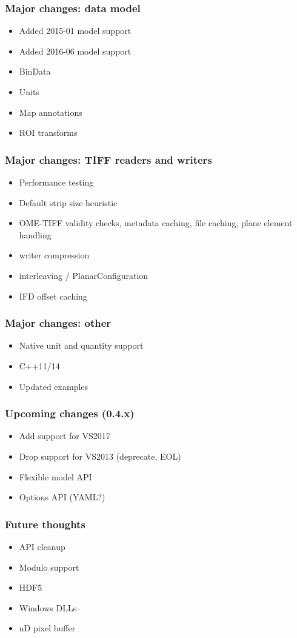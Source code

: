 \documentclass{beamer}
\begin{document}
\begin{frame}[fragile]
  \frametitle{Major changes: data model}

  \begin{itemize}
  \item Added 2015-01 model support
  \item Added 2016-06 model support
  \item BinData
  \item Units
  \item Map annotations
  \item ROI transforms
  \end{itemize}
\end{frame}

\begin{frame}[fragile]
  \frametitle{Major changes: TIFF readers and writers}

  \begin{itemize}
  \item Performance testing
  \item Default strip size heuristic
  \item OME-TIFF validity checks, metadata caching, file caching, plane element handling
  \item writer compression
  \item interleaving / PlanarConfiguration
  \item IFD offset caching
    
  \end{itemize}
\end{frame}

\begin{frame}[fragile]
  \frametitle{Major changes: other}

  \begin{itemize}
  \item Native unit and quantity support
  \item C++11/14
  \item Updated examples
  \end{itemize}
\end{frame}

\begin{frame}[fragile]
  \frametitle{Upcoming changes (0.4.x)}

  \begin{itemize}
  \item Add support for VS2017
  \item Drop support for VS2013 (deprecate, EOL)
  \item Flexible model API
  \item Options API (YAML?)
  \end{itemize}
\end{frame}

\begin{frame}[fragile]
  \frametitle{Future thoughts}

  \begin{itemize}
  \item API cleanup
  \item Modulo support
  \item HDF5
  \item Windows DLLs
  \item nD pixel buffer
  \end{itemize}
\end{frame}
\end{document}
